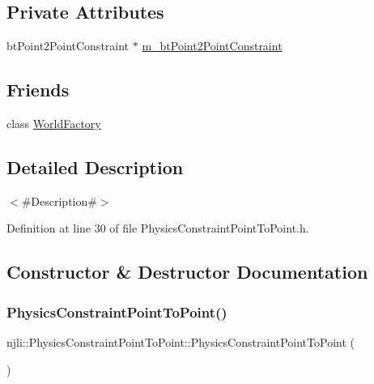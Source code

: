 \subsection*{Private Attributes}
\begin{DoxyCompactItemize}
\item 
bt\+Point2\+Point\+Constraint $\ast$ \mbox{\hyperlink{classnjli_1_1_physics_constraint_point_to_point_a54d76a95cd5fd595cc8c71715479cccf}{m\+\_\+bt\+Point2\+Point\+Constraint}}
\end{DoxyCompactItemize}
\subsection*{Friends}
\begin{DoxyCompactItemize}
\item 
class \mbox{\hyperlink{classnjli_1_1_physics_constraint_point_to_point_acb96ebb09abe8f2a37a915a842babfac}{World\+Factory}}
\end{DoxyCompactItemize}


\subsection{Detailed Description}
$<$\#\+Description\#$>$ 

Definition at line 30 of file Physics\+Constraint\+Point\+To\+Point.\+h.



\subsection{Constructor \& Destructor Documentation}
\mbox{\label{classnjli_1_1_physics_constraint_point_to_point_a6fe4d9bb07a35df5e54e96762f305905}} 
\subsubsection{\texorpdfstring{Physics\+Constraint\+Point\+To\+Point()}{PhysicsConstraintPointToPoint()}\hspace{0.1cm}{\footnotesize\ttfamily [1/3]}}
{\footnotesize\ttfamily njli\+::\+Physics\+Constraint\+Point\+To\+Point\+::\+Physics\+Constraint\+Point\+To\+Point (\begin{DoxyParamCaption}{ }\end{DoxyParamCaption})\hspace{0.3cm}{\ttfamily [protected]}}

